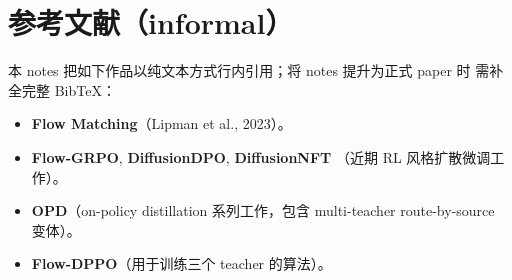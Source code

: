 \documentclass[11pt,a4paper]{article}
\theoremstyle{definition}
\begin{document}
\section*{参考文献（informal）}
本 notes 把如下作品以纯文本方式行内引用；将 notes 提升为正式 paper 时
需补全完整 BibTeX：
\begin{itemize}[leftmargin=1.5em]
\item \textbf{Flow Matching}（Lipman et al., 2023）。
\item \textbf{Flow-GRPO}, \textbf{DiffusionDPO}, \textbf{DiffusionNFT}
（近期 RL 风格扩散微调工作）。
\item \textbf{OPD}（on-policy distillation 系列工作，包含
multi-teacher route-by-source 变体）。
\item \textbf{Flow-DPPO}（用于训练三个 teacher 的算法）。
\end{itemize}
\end{document}

